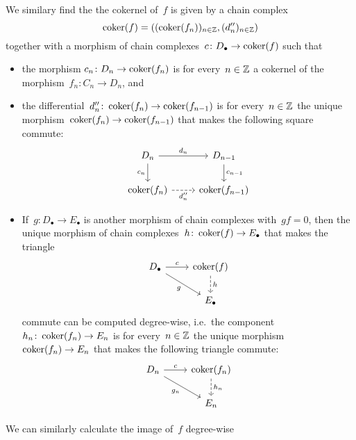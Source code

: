 We similary find the the cokernel of~$f$ is given by a chain complex
\[
    \operatorname{coker}(f)
  = ( (\operatorname{coker}(f_n))_{n \in \mathbb{Z}}, (d''_n)_{n \in \mathbb{Z}} )
\]
together with a morphism of chain complexes~$c \colon D_\bullet \to \operatorname{coker}(f)$ such that
\begin{itemize}
  \item
    the morphism $c_n \colon D_n \to \operatorname{coker}(f_n)$ is for every~$n \in \mathbb{Z}$ a cokernel of the morphism~$f_n \colon C_n \to D_n$, and
  \item
    the differential~$d''_n \colon \operatorname{coker}(f_n) \to \operatorname{coker}(f_{n-1})$ is for every~$n \in \mathbb{Z}$ the unique morphism~$\operatorname{coker}(f_n) \to \operatorname{coker}(f_{n-1})$ that makes the following square commute:
    \[
      \begin{tikzcd}
          D_n
          \arrow{r}[above]{d_n}
          \arrow{d}[left]{c_n}
        & D_{n-1}
          \arrow{d}[right]{c_{n-1}}
        \\
          \coker(f_n)
          \arrow[dashed]{r}[below]{d''_n}
        & \coker(f_{n-1})
      \end{tikzcd}
    \]
  \item
    If~$g \colon D_\bullet \to E_\bullet$ is another morphism of chain complexes with~$g f = 0$, then the unique morphism of chain complexes~$h \colon \operatorname{coker}(f) \to E_\bullet$ that makes the triangle
    \[
      \begin{tikzcd}
          D_\bullet
          \arrow{r}[above]{c}
          \arrow{dr}[below left]{g}
        & \coker(f)
          \arrow[dashed]{d}[right]{h}
        \\
          {}
        & E_\bullet
      \end{tikzcd}
    \]
    commute can be computed degree-wise, i.e.\ the component~$h_n \colon \operatorname{coker}(f_n) \to E_n$ is for every~$n \in \mathbb{Z}$ the unique morphism~$\operatorname{coker}(f_n) \to E_n$ that makes the following triangle commute:
    \[
      \begin{tikzcd}
          D_n
          \arrow{r}[above]{c}
          \arrow{dr}[below left]{g_n}
        & \coker(f_n)
          \arrow[dashed]{d}[right]{h_n}
        \\
          {}
        & E_n
      \end{tikzcd}
    \]
\end{itemize}
We can similarly calculate the image of~$f$ degree-wise





\subsection{}

